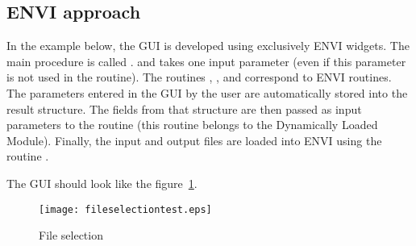 \subsection{ENVI approach}\label{enviapp}
In the example below, the GUI is developed using exclusively ENVI widgets. The main procedure is called . 
and takes one input parameter (even if this parameter is not used in the routine). The routines , ,  
and  correspond to ENVI routines. The parameters entered in the GUI by the user are automatically stored into the result structure. 
The fields from that structure are then passed as input parameters to the routine  (this routine belongs to the Dynamically Loaded Module).
Finally, the input and output files are loaded into ENVI using the routine .

The GUI should look like the figure~\ref{fig:fileselectiontest}.

\begin{figure}
\label{fileselectiontest}
\begin{center}
\texttt{[image: fileselectiontest.eps]}
\caption{File selection}
\end{center}
\label{fig:fileselectiontest}
\end{figure}


